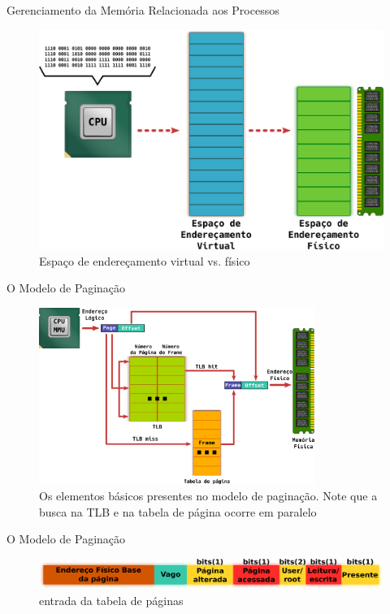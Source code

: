 \documentclass[xcolor={usenames,svgnames,dvipsnames},brazil,english,12pt,aspectratio=149]{beamer}
\begin{document}
\begin{frame}{Gerenciamento da Memória Relacionada aos Processos}
	\begin{figure}[!h]
		\centering
		\includegraphics[width=.5\textwidth]{virtual_vs_fisico} 
		\caption{Espaço de endereçamento virtual vs. físico}
		\label{fig:vas_pas}
	\end{figure}
\end{frame}

\begin{frame}{O Modelo de Paginação}
	\begin{figure}[!h]
		\centering
		\includegraphics[width=0.8\textwidth]{paginacao} 
		\caption{Os elementos básicos presentes no modelo de paginação. Note que a busca na TLB e na tabela de página ocorre em paralelo}
		\label{fig:paginacao}
	\end{figure}
\end{frame}

\begin{frame}{O Modelo de Paginação}
	\begin{figure}[!h]
		\centering
		\includegraphics[width=\textwidth]{pte}
		\caption{entrada da tabela de páginas}
		\label{fig:pte}
	\end{figure}
\end{frame}
\end{document}

